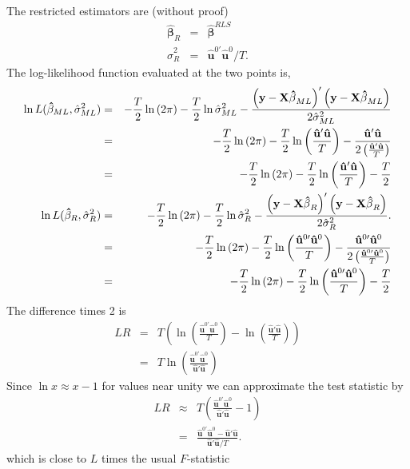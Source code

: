 \documentclass{article}
\begin{document}
The restricted estimators are (without proof)
\begin{eqnarray*}
\mathbf{\hat{\beta}}_{R} &=&\mathbf{\hat{\beta}}^{RLS} \\
\hat{\sigma}_{R}^{2} &=&\mathbf{\hat{u}}^{0\prime }\mathbf{\hat{u}}^{0}/T.
\end{eqnarray*}
The log-likelihood function evaluated at the two points is,
\begin{eqnarray*}
\ln L(\mathbf{\hat{\beta}}_{ML},\hat{\sigma}_{ML}^{2}) &=&-\frac{T}{2}\ln
\left( 2\pi \right) -\frac{T}{2}\ln \hat{\sigma}_{ML}^{2}-\frac{\left( 
\mathbf{y}-\mathbf{X\hat{\beta}}_{ML}\right) '\left( \mathbf{y}-%
\mathbf{X\hat{\beta}}_{ML}\right) }{2\hat{\sigma}_{ML}^{2}} \\
&=&-\frac{T}{2}\ln \left( 2\pi \right) -\frac{T}{2}\ln \left( \frac{\mathbf{%
\hat{u}}'\mathbf{\hat{u}}}{T}\right) -\frac{\mathbf{\hat{u}}%
'\mathbf{\hat{u}}}{2\left( \frac{\mathbf{\hat{u}}'\mathbf{%
\hat{u}}}{T}\right) } \\
&=&-\frac{T}{2}\ln \left( 2\pi \right) -\frac{T}{2}\ln \left( \frac{\mathbf{%
\hat{u}}'\mathbf{\hat{u}}}{T}\right) -\frac{T}{2} \\
\ln L(\mathbf{\hat{\beta}}_{R},\hat{\sigma}_{R}^{2}) &=&-\frac{T}{2}\ln
\left( 2\pi \right) -\frac{T}{2}\ln \hat{\sigma}_{R}^{2}-\frac{\left( 
\mathbf{y}-\mathbf{X\hat{\beta}}_{R}\right) '\left( \mathbf{y}-%
\mathbf{X\hat{\beta}}_{R}\right) }{2\hat{\sigma}_{R}^{2}}. \\
&=&-\frac{T}{2}\ln \left( 2\pi \right) -\frac{T}{2}\ln \left( \frac{\mathbf{%
\hat{u}}^{0\prime }\mathbf{\hat{u}}^{0}}{T}\right) -\frac{\mathbf{\hat{u}}%
^{0\prime }\mathbf{\hat{u}}^{0}}{2\left( \frac{\mathbf{\hat{u}}^{0\prime }%
\mathbf{\hat{u}}^{0}}{T}\right) } \\
&=&-\frac{T}{2}\ln \left( 2\pi \right) -\frac{T}{2}\ln \left( \frac{\mathbf{%
\hat{u}}^{0\prime }\mathbf{\hat{u}}^{0}}{T}\right) -\frac{T}{2}
\end{eqnarray*}%
The difference times 2 is
\begin{eqnarray*}
LR &=&T\left( \ln \left( \frac{\mathbf{\hat{u}}^{0\prime }\mathbf{\hat{u}}^{0}}{T}\right) 
-\ln \left( \frac{\mathbf{\hat{u}}'\mathbf{\hat{u}}}{T}\right) \right) \\
&=&T\ln \left( \frac{\mathbf{\hat{u}}^{0\prime }\mathbf{\hat{u}}^{0}}
{\mathbf{\hat{u}}'\mathbf{\hat{u}}}\right)
\end{eqnarray*}
Since $\ln x\approx x-1$ for values near unity we can approximate the test
statistic by
\begin{eqnarray*}
LR &\approx &T\left( \frac{\mathbf{\hat{u}}^{0\prime }\mathbf{\hat{u}}^{0}}
{\mathbf{\hat{u}}'\mathbf{\hat{u}}}-1\right) \\
&=&\frac{\mathbf{\hat{u}}^{0\prime }\mathbf{\hat{u}}^{0}
-\mathbf{\hat{u}}'\mathbf{\hat{u}}}{\mathbf{\hat{u}}'\mathbf{\hat{u}/}T}.
\end{eqnarray*}
which is close to $L$ times the usual $F$-statistic%
\end{document}
